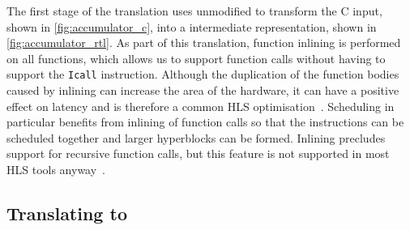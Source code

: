 The first stage of the translation uses unmodified \compcert{} to transform the
C input, shown in \cref{fig:accumulator_c}, into a \rtl{} intermediate
representation, shown in \cref{fig:accumulator_rtl}.  As part of this
translation, function inlining is performed on all functions, which allows us to
support function calls without having to support the \texttt{Icall} \rtl{}
instruction.  Although the duplication of the function bodies caused by inlining
can increase the area of the hardware, it can have a positive effect on latency
and is therefore a common HLS optimisation~\cite{noronha17_rapid_fpga}.
Scheduling in particular benefits from inlining of function calls so that the
instructions can be scheduled together and larger hyperblocks can be formed.
Inlining precludes support for recursive function calls, but this feature is not
supported in most HLS tools anyway~\cite{thomas16_srcht}.

\subsection{Translating \rtl{} to \htl{}}




